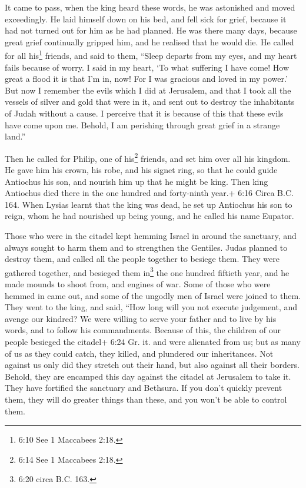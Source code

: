  It came to pass, when the king heard these words, he was
astonished and moved exceedingly. He laid himself down on his bed, and
fell sick for grief, because it had not turned out for him as he had
planned.  He was there many days, because great grief
continually gripped him, and he realised that he would die.
 He called for all his\footnote{6:10 See 1 Maccabees 2:18.}
friends, and said to them, ``Sleep departs from my eyes, and my heart
fails because of worry.  I said in my heart, `To what
suffering I have come! How great a flood it is that I'm in, now! For I
was gracious and loved in my power.'  But now I remember
the evils which I did at Jerusalem, and that I took all the vessels of
silver and gold that were in it, and sent out to destroy the inhabitants
of Judah without a cause.  I perceive that it is because of
this that these evils have come upon me. Behold, I am perishing through
great grief in a strange land.''

 Then he called for Philip, one of his\footnote{6:14 See 1
  Maccabees 2:18.} friends, and set him over all his kingdom.
 He gave him his crown, his robe, and his signet ring, so
that he could guide Antiochus his son, and nourish him up that he might
be king.  Then king Antiochus died there in the one hundred
and forty-ninth year.+ 6:16 Circa B.C. 164.  When Lysias
learnt that the king was dead, he set up Antiochus his son to reign,
whom he had nourished up being young, and he called his name Eupator.

 Those who were in the citadel kept hemming Israel in
around the sanctuary, and always sought to harm them and to strengthen
the Gentiles.  Judas planned to destroy them, and called
all the people together to besiege them.  They were
gathered together, and besieged them in\footnote{6:20 circa B.C. 163.}
the one hundred fiftieth year, and he made mounds to shoot from, and
engines of war.  Some of those who were hemmed in came out,
and some of the ungodly men of Israel were joined to them. 
They went to the king, and said, ``How long will you not execute
judgement, and avenge our kindred?  We were willing to
serve your father and to live by his words, and to follow his
commandments.  Because of this, the children of our people
besieged the citadel+ 6:24 Gr. it. and were alienated from us; but as
many of us as they could catch, they killed, and plundered our
inheritances.  Not against us only did they stretch out
their hand, but also against all their borders.  Behold,
they are encamped this day against the citadel at Jerusalem to take it.
They have fortified the sanctuary and Bethsura.  If you
don't quickly prevent them, they will do greater things than these, and
you won't be able to control them.


